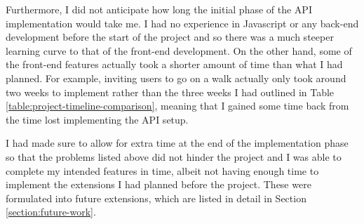 Furthermore, I did not anticipate how long the initial phase of the API implementation would take me. I had no experience in Javascript or any back-end development before the start of the project and so there was a much steeper learning curve to that of the front-end development. On the other hand, some of the front-end features actually took a shorter amount of time than what I had planned. For example, inviting users to go on a walk actually only took around two weeks to implement rather than the three weeks I had outlined in Table \ref{table:project-timeline-comparison}, meaning that I gained some time back from the time lost implementing the API setup.

I had made sure to allow for extra time at the end of the implementation phase so that the problems listed above did not hinder the project and I was able to complete my intended features in time, albeit not having enough time to implement the extensions I had planned before the project. These were formulated into future extensions, which are listed in detail in Section \ref{section:future-work}.


